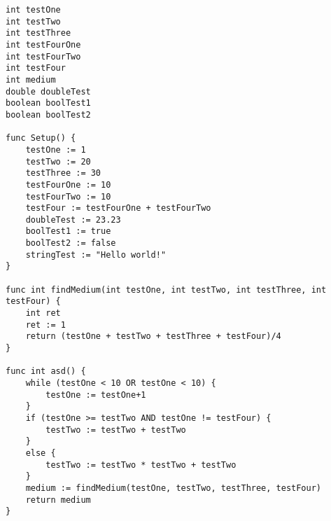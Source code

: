 \begin{lstlisting}[caption={Example full program}, label={ex01}]
int testOne
int testTwo
int testThree
int testFourOne
int testFourTwo
int testFour
int medium
double doubleTest
boolean boolTest1
boolean boolTest2

func Setup() {
	testOne := 1
	testTwo := 20
	testThree := 30
	testFourOne := 10
	testFourTwo := 10
	testFour := testFourOne + testFourTwo
	doubleTest := 23.23
	boolTest1 := true
	boolTest2 := false
	stringTest := "Hello world!"
}

func int findMedium(int testOne, int testTwo, int testThree, int testFour) {
	int ret
	ret := 1
	return (testOne + testTwo + testThree + testFour)/4
}

func int asd() {
	while (testOne < 10 OR testOne < 10) {
		testOne := testOne+1
	}
	if (testOne >= testTwo AND testOne != testFour) {
		testTwo := testTwo + testTwo
	}
	else {
		testTwo := testTwo * testTwo + testTwo
	}
	medium := findMedium(testOne, testTwo, testThree, testFour)
	return medium
}
\end{lstlisting}